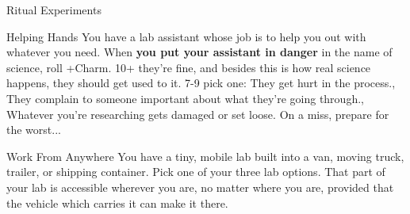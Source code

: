 {\begin{move}{Ritual Experiments}
\end{move}%
\br[1mm]
%
\begin{move}{Helping Hands}
You have a lab assistant whose job is to help you out with whatever you need.  When \textbf{you put your assistant in danger} in the name of science, roll +Charm.  10+ they’re fine, and besides this is how real science happens, they should get used to it.  7-9 pick one:
\holdoptions%
    {{They get hurt in the process.},
    {They complain to someone important about what they’re going through.},
    {Whatever you’re researching gets damaged or set loose.}}%
On a miss, prepare for the worst...
\end{move}%
\br[1mm]
%
\begin{move}{Work From Anywhere}
You have a tiny, mobile lab built into a van, moving truck, trailer, or shipping container.  Pick one of your three lab options.  That part of your lab is accessible wherever you are, no matter where you are, provided that the vehicle which carries it can make it there.
\end{move}%
\br[1mm]
%
%
}\pagebreak%
%
